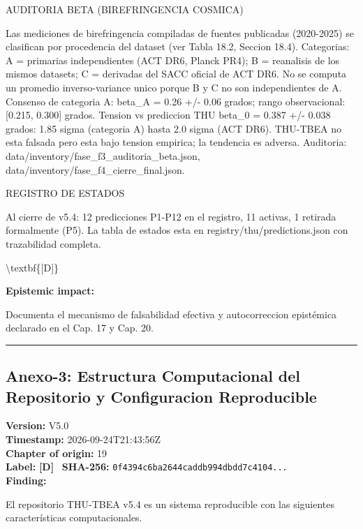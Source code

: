 ﻿\documentclass[11pt,letterpaper]{article}
\begin{document}
AUDITORIA BETA (BIREFRINGENCIA COSMICA)

Las mediciones de birefringencia compiladas de fuentes publicadas (2020-2025) se clasifican por procedencia del dataset (ver Tabla 18.2, Seccion 18.4). Categorias: A = primarias independientes (ACT DR6, Planck PR4); B = reanalisis de los mismos datasets; C = derivadas del SACC oficial de ACT DR6. No se computa un promedio inverso-variance unico porque B y C no son independientes de A. Consenso de categoria A: beta_A = 0.26 +/- 0.06 grados; rango observacional: [0.215, 0.300] grados. Tension vs prediccion THU beta_0 = 0.387 +/- 0.038 grados: 1.85 sigma (categoria A) hasta 2.0 sigma (ACT DR6). THU-TBEA no esta falsada pero esta bajo tension empirica; la tendencia es adversa. Auditoria: data/inventory/fase_f3_auditoria_beta.json, data/inventory/fase_f4_cierre_final.json.

REGISTRO DE ESTADOS

Al cierre de v5.4: 12 predicciones P1-P12 en el registro, 11 activas, 1 retirada formalmente (P5). La tabla de estados esta en registry/thu/predictions.json con trazabilidad completa.

\textbackslash{}textbf\{[D]\}

\textbf{Epistemic impact:}

Documenta el mecanismo de falsabilidad efectiva y autocorreccion epistémica declarado en el Cap. 17 y Cap. 20.

\vspace{1em}\hrule\vspace{1em}
\subsection*{Anexo-3: Estructura Computacional del Repositorio y Configuracion Reproducible}
\textbf{Version:} V5.0 \\
\textbf{Timestamp:} 2026-09-24T21:43:56Z \\
\textbf{Chapter of origin:} 19 \\
\textbf{Label:} \textcolor{Dgreen}{\textbf{[D]}} \
\textbf{SHA-256:} \texttt{0f4394c6ba2644caddb994dbdd7c4104...} \\[0.5em]
\textbf{Finding:}

El repositorio THU-TBEA v5.4 es un sistema reproducible con las siguientes características computacionales.
\end{document}
